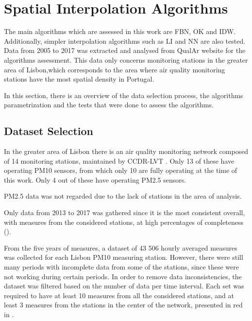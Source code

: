 

\section{Spatial Interpolation Algorithms}

The main algorithms which are assessed in this work are FBN, OK and IDW. Additionally, simpler interpolation algorithms such as LI and NN are also tested. Data from 2005 to 2017 was extracted and analysed from QualAr website for the algorithms assessment. This data only concerns monitoring stations in the greater area of Lisbon,which corresponds to the area where air quality monitoring stations have the most spatial density in Portugal.

In this section, there is an overview of the data selection process, the algorithms parametrization and the tests that were done to assess the algorithms.


\subsection{Dataset Selection}

In the greater area of Lisbon there is an air quality monitoring network composed of 14 monitoring stations, maintained by \ac{CCDR-LVT} \cite{QualAr}. Only 13 of these have operating PM10 sensors, from which only 10 are fully operating at the time of this work. Only 4 out of these have operating PM2.5 sensors. 

PM2.5 data was not regarded due to the lack of stations in the area of analysis. 

Only data from 2013 to 2017 was gathered since it is the most consistent overall, with measures from the considered stations, at high percentages of completeness ().

From the five years of measures, a dataset of 43 506 hourly averaged measures was collected for each Lisbon PM10 measuring station. However, there were still many periods with incomplete data from some of the stations, since these were not working during certain periods. In order to remove data inconsistencies, the dataset was filtered based on the number of data per time interval. Each set was required to have at least 10 measures from all the considered stations, and at least 3 measures from the stations in the center of the network, presented in red in .

